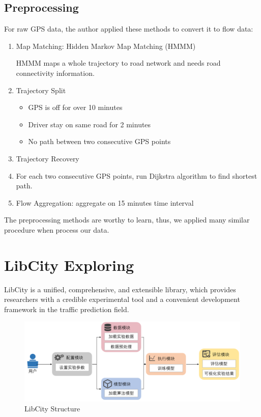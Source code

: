 \documentclass[fontset=none]{ctexart}
\theoremstyle{definition}
\theoremstyle{remark}
\begin{document}
\subsection{Preprocessing}
For raw GPS data, the author applied these methods to convert it to flow data:
\begin{enumerate}
  \item Map Matching: Hidden Markov Map Matching (HMMM)

        HMMM maps a whole trajectory to road network and needs road connectivity information.
  \item Trajectory Split
        \begin{itemize}
          \item GPS is off for over 10 minutes
          \item Driver stay on same road for 2 minutes
          \item No path between two consecutive GPS points
        \end{itemize}
  \item Trajectory Recovery
  \item 
        For each two consecutive GPS points, run Dijkstra algorithm to find shortest path.
  \item Flow Aggregation: aggregate on 15 minutes time interval
\end{enumerate}

The preprocessing methods are worthy to learn, thus, we applied many similar procedure when process our data.

\clearpage
\section{LibCity Exploring}
LibCity\cite{10.1145/3474717.3483923} is a unified, comprehensive, and extensible library, which provides researchers with a credible experimental tool and a convenient development framework in the traffic prediction field.
\begin{figure}[htb]
  \centering
  \includegraphics[width=\textwidth]{images/9-2-1.png}
  \caption{LibCity Structure}
  \label{921}
\end{figure}
\end{document}
